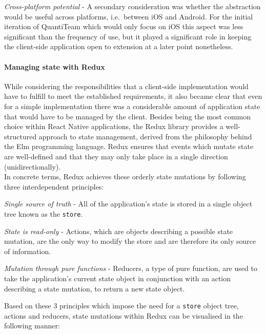 \documentclass[12pt]{report}
\let\oldparagraph\paragraph
\renewcommand{\paragraph}[1]{\oldparagraph{#1}\mbox{}}
\begin{document}
\emph{Cross-platform potential} - A secondary consideration was whether
the abstraction would be useful across platforms, i.e.~between iOS and
Android. For the initial iteration of QuantiTeam which would only focus
on iOS this aspect was less significant than the frequency of use, but
it played a significant role in keeping the client-side application open
to extension at a later point nonetheless.

\paragraph{Managing state with Redux}\label{managing-state-with-redux}

While considering the responsibilities that a client-side implementation
would have to fulfill to meet the established requirements, it also
became clear that even for a simple implementation there was a
considerable amount of application state that would have to be managed
by the client. Besides being the most common choice within React Native
applications, the Redux library provides a well-structured approach to
state management, derived from the philosophy behind the Elm programming
language. Redux ensures that events which mutate state are well-defined
and that they may only take place in a single direction
(unidirectionally).\\
In concrete terms, Redux achieves these orderly state mutations by
following three interdependent
principles\cite{1redux}:

\emph{Single source of truth} - All of the application's state is stored
in a single object tree known as the \texttt{store}.

\emph{State is read-only} - Actions, which are objects describing a
possible state mutation, are the only way to modify the store and are
therefore its only source of information.

\emph{Mutation through pure functions} - Reducers, a type of pure
function, are used to take the application's current state object in
conjunction with an action describing a state mutation, to return a new
state object.

Based on these 3 principles which impose the need for a \texttt{store}
object tree, actions and reducers, state mutations within Redux can be
visualised in the following manner:
\end{document}
